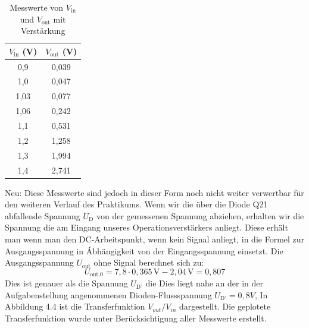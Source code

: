 \begin{table}[h]
\centering
\begin{tabular}{|c|c|}
\hline
$V_{\text{in}}$ (V) & $V_{\text{out}}$ (V) \\
\hline
0{,}9 & 0{,}039 \\
1{,}0 & 0{,}047\\
1{,}03 & 0{,}077 \\
1{,}06 & 0{,}242 \\
1{,}1 & 0{,}531 \\
1{,}2 & 1{,}258 \\
1{,}3 & 1{,}994 \\
1{,}4 & 2{,}741 \\
\hline
\end{tabular}
\caption{Messwerte von $V_{\text{in}}$ und $V_{\text{out}}$ mit Verstärkung}
\end{table}
Neu: Diese Messwerte sind jedoch in dieser Form noch nicht weiter verwertbar für den weiteren Verlauf 
des Praktikums. Wenn wir die über die Diode Q21 abfallende Spannung $U_{\text{D}}$ von der gemessenen
Spannung abziehen, erhalten wir die Spannung die am Eingang unseres Operationsverstärkers anliegt.
Diese erhält man wenn man den DC-Arbeitspunkt, wenn kein Signal anliegt, in die Formel zur Ausgangsspannung
in Ábhängigkeit von der Eingangsspannung einsetzt.
Die Ausgangsspannung $U_\text{out}$ ohne Signal berechnet sich zu:
\[
U_\text{out,0} = 7{,}8 \cdot 0{,}365\,\text{V} - 2{,}04\,\text{V} = 0{,}807\]
Dies ist genauer als die Spannung $U_\text{D'}$ die 
Dies liegt nahe an der in der Aufgabenstellung angenommenen Dioden-Flussspannung $U_\text{D'} = 0,8V$,
\clearpage
In Abbildung 4.4 ist die Transferfunktion $V_{out}/V_{in}$ dargestellt. Die geplotete Transferfunktion wurde
unter Berücksichtigung aller Messwerte erstellt.\\

